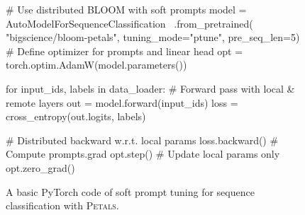 \begin{figure}[tb]
\small
\begin{pythoncode}
# Use distributed BLOOM with soft prompts
model = AutoModelForSequenceClassification \
    .from_pretrained(
        "bigscience/bloom-petals",
        tuning_mode="ptune", pre_seq_len=5)
# Define optimizer for prompts and linear head
opt = torch.optim.AdamW(model.parameters())

for input_ids, labels in data_loader:
    # Forward pass with local & remote layers
    out = model.forward(input_ids)
    loss = cross_entropy(out.logits, labels)

    # Distributed backward w.r.t. local params
    loss.backward() # Compute prompts.grad
    opt.step() # Update local params only
    opt.zero_grad()
\end{pythoncode}
\vspace{-5pt}
\caption{A basic PyTorch code of soft prompt tuning for sequence classification with \textsc{Petals}.}
\label{fig:training_snippet}
\vspace{-10pt}
\end{figure}








